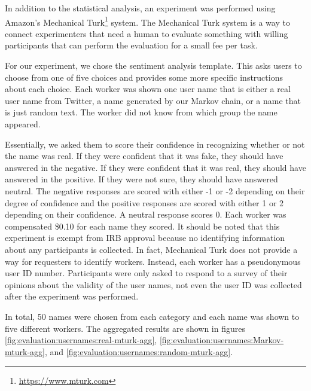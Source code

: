 In addition to the statistical analysis, an experiment was performed using Amazon's
Mechanical Turk\footnote{\url{https://www.mturk.com}} system.  The Mechanical Turk
system is a way to connect experimenters that need a human to evaluate something
with willing participants that can perform the evaluation for a small fee per task.

For our experiment, we chose the sentiment analysis template.  This asks users
to choose from one of five choices and provides some more specific instructions
about each choice.  Each worker was shown one user name that is either a real user
name from Twitter, a name generated by our Markov chain, or a name that is just
random text.  The worker did not know from which group the name appeared.  

Essentially, we asked them to
score their confidence in recognizing whether or not the name was real.  If
they were confident that it was fake, they should have answered in the negative.
If they were confident that it was real, they should have answered in the positive.
If they were not sure, they should have answered neutral.  The negative responses
are scored with either -1 or -2 depending on their degree of confidence and the
positive responses are scored with either 1 or 2 depending on their confidence.
A neutral response scores 0.  Each worker was compensated \$0.10 for each name
they scored.  It should be noted that this experiment is exempt from IRB
approval because no identifying information about any participants is collected.
In fact, Mechanical Turk does not provide a way for requesters to identify workers.
Instead, each worker has a pseudonymous user ID number.  Participants were only
asked to respond to a survey of their opinions about the validity of the user names,
not even the user ID was collected after the experiment was performed.

In total, 50 names were chosen from each category and each name
was shown to five different workers.  The aggregated results are shown in figures
\ref{fig:evaluation:usernames:real-mturk-agg}, \ref{fig:evaluation:usernames:Markov-mturk-agg},
and \ref{fig:evaluation:usernames:random-mturk-agg}.  

